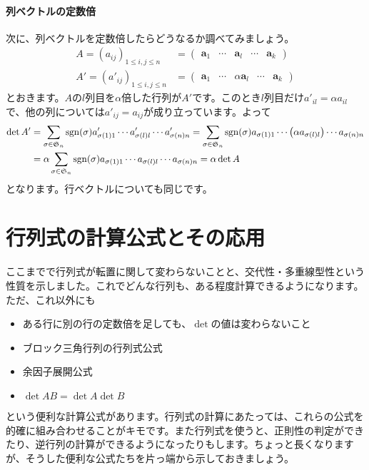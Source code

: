 \paragraph{列ベクトルの定数倍} 次に、列ベクトルを定数倍したらどうなるか調べてみましょう。
\begin{align*}
A = (a_{ij})_{1 \leq i, j \leq n}
&= \begin{pmatrix}
\bm{a}_1 & \cdots & \bm{a}_l & \cdots & \bm{a}_k
\end{pmatrix} \\
A' = (a'_{ij})_{1 \leq i, j \leq n}
&= \begin{pmatrix}
\bm{a}_1 & \cdots & \alpha \bm{a}_l & \cdots & \bm{a}_k
\end{pmatrix}
\end{align*}
とおきます。$A$の$l$列目を$\alpha$倍した行列が$A'$です。このとき$l$列目だけ$a'_{il} = \alpha a_{il}$で、他の列については$a'_{ij} = a_{ij}$が成り立っています。よって
\begin{align*}
\det A'
&= \sum_{\sigma \in \mathfrak{S}_n} \operatorname{sgn}(\sigma) a'_{\sigma(1)1} \cdots a'_{\sigma(l)l} \cdots a'_{\sigma(n)n}
= \sum_{\sigma \in \mathfrak{S}_n} \operatorname{sgn}(\sigma) a_{\sigma(1)1} \cdots \bigl(\alpha a_{\sigma(l)l}\bigr) \cdots a_{\sigma(n)n} \\
&= \alpha \sum_{\sigma \in \mathfrak{S}_n} \operatorname{sgn}(\sigma) a_{\sigma(1)1} \cdots a_{\sigma(l)l} \cdots a_{\sigma(n)n}
= \alpha \det A
\end{align*}
となります。行ベクトルについても同じです。

\section{行列式の計算公式とその応用}

ここまでで行列式が転置に関して変わらないことと、交代性・多重線型性という性質を示しました。これでどんな行列も、ある程度計算できるようになります。ただ、これ以外にも
\begin{itemize}
\item ある行に別の行の定数倍を足しても、$\det$の値は変わらないこと
\item ブロック三角行列の行列式公式
\item 余因子展開公式
\item $\det AB = \det A \det B$
\end{itemize}
という便利な計算公式があります。行列式の計算にあたっては、これらの公式を的確に組み合わせることがキモです。また行列式を使うと、正則性の判定ができたり、逆行列の計算ができるようになったりもします。ちょっと長くなりますが、そうした便利な公式たちを片っ端から示しておきましょう。

